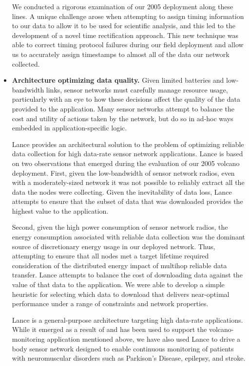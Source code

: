 \begin{itemize}
We conducted a rigorous examination of our 2005 deployment along these lines.
A unique challenge arose when attempting to assign timing information to our
data to allow it to be used for scientific analysis, and this led to the
development of a novel time rectification approach. This new technique was
able to correct timing protocol failures during our field deployment and
allow us to accurately assign timestamps to almost all of the data our
network collected.

\item \textbf{Architecture optimizing data quality.} Given limited batteries
and low-bandwidth links, sensor networks must carefully manage resource
usage, particularly with an eye to how these decisions affect the quality of
the data provided to the application. Many sensor networks attempt to balance
the cost and utility of actions taken by the network, but do so in ad-hoc
ways embedded in application-specific logic.

Lance provides an architectural solution to the problem of optimizing
reliable data collection for high data-rate sensor network applications.
Lance is based on two observations that emerged during the evaluation of our
2005 volcano deployment. First, given the low-bandwidth of sensor network
radios, even with a moderately-sized network it was not possible to reliably
extract all the data the nodes were collecting. Given the inevitability of
data loss, Lance attempts to ensure that the subset of data that was
downloaded provides the highest value to the application.

Second, given the high power consumption of sensor network radios, the energy
consumption associated with reliable data collection was the dominant source
of discretionary energy usage in our deployed network. Thus, attempting to
ensure that all nodes met a target lifetime required consideration of the
distributed energy impact of multihop reliable data transfer. Lance attempts
to balance the cost of downloading data against the value of that data to the
application. We were able to develop a simple heuristic for selecting which
data to download that delivers near-optimal performance under a range of
constraints and network properties.

Lance is a general-purpose architecture targeting high data-rate
applications. While it emerged as a result of and has been used to support
the volcano-monitoring application mentioned above, we have also used Lance
to drive a body sensor network designed to enable continuous monitoring of
patients with neuromuscular disorders such as Parkison's Disease, epilepsy,
and stroke.


\end{itemize}
